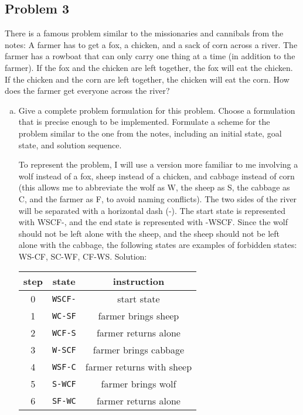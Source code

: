 \documentclass{math}
\begin{document}
\subsection*{Problem 3}
There is a famous problem similar to the missionaries and cannibals from the
notes: A farmer has to get a fox, a chicken, and a sack of corn across a river.
The farmer has a rowboat that can only carry one thing at a time (in addition to
the farmer). If the fox and the chicken are left together, the fox will eat the
chicken. If the chicken and the corn are left together, the chicken will eat the
corn. How does the farmer get everyone across the river?
\begin{enumerate}[(a)]
  \item Give a complete problem formulation for this problem. Choose a
  formulation that is precise enough to be implemented. Formulate a scheme for
  the problem similar to the one from the notes, including an initial state,
  goal state, and solution sequence.
  \par To represent the problem, I will use a version more familiar to me
  involving a wolf instead of a fox, sheep instead of a chicken, and cabbage
  instead of corn (this allows me to abbreviate the wolf as W, the sheep as S,
  the cabbage as C, and the farmer as F, to avoid naming conflicts). The two
  sides of the river will be separated with a horizontal dash (-). The start
  state is represented with WSCF-, and the end state is represented with -WSCF.
  Since the wolf should not be left alone with the sheep, and the sheep should
  not be left alone with the cabbage, the following states are examples of
  forbidden states: WS-CF, SC-WF, CF-WS. Solution:
  \begin{center}
    \begin{tabular}{|c|c|c|}
      \hline
      step & state & instruction \\ \hline
      0 & \texttt{WSCF-} & start state \\ \hline
      1 & \texttt{WC-SF} & farmer brings sheep \\ \hline
      2 & \texttt{WCF-S} & farmer returns alone \\ \hline
      3 & \texttt{W-SCF} & farmer brings cabbage \\ \hline
      4 & \texttt{WSF-C} & farmer returns with sheep \\ \hline
      5 & \texttt{S-WCF} & farmer brings wolf \\ \hline
      6 & \texttt{SF-WC} & farmer returns alone \\ \hline

\end{tabular}
\end{center}
\end{enumerate}
\end{document}
